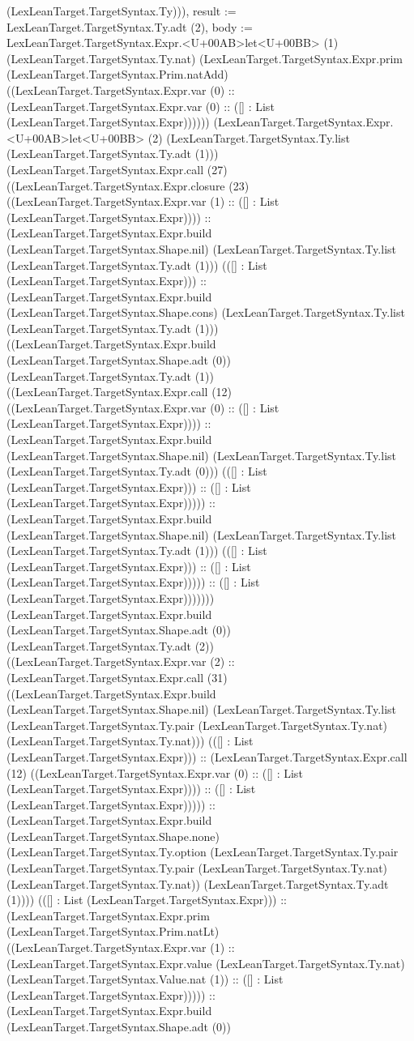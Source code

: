 \documentclass[11pt]{article}
\begin{document}
(LexLeanTarget.TargetSyntax.Ty))), result := LexLeanTarget.TargetSyntax.Ty.adt (2), body := LexLeanTarget.TargetSyntax.Expr.<U+00AB>let<U+00BB> (1) (LexLeanTarget.TargetSyntax.Ty.nat) (LexLeanTarget.TargetSyntax.Expr.prim (LexLeanTarget.TargetSyntax.Prim.natAdd) ((LexLeanTarget.TargetSyntax.Expr.var (0) :: (LexLeanTarget.TargetSyntax.Expr.var (0) :: ([] : List (LexLeanTarget.TargetSyntax.Expr)))))) (LexLeanTarget.TargetSyntax.Expr.<U+00AB>let<U+00BB> (2) (LexLeanTarget.TargetSyntax.Ty.list (LexLeanTarget.TargetSyntax.Ty.adt (1))) (LexLeanTarget.TargetSyntax.Expr.call (27) ((LexLeanTarget.TargetSyntax.Expr.closure (23) ((LexLeanTarget.TargetSyntax.Expr.var (1) :: ([] : List (LexLeanTarget.TargetSyntax.Expr)))) :: (LexLeanTarget.TargetSyntax.Expr.build (LexLeanTarget.TargetSyntax.Shape.nil) (LexLeanTarget.TargetSyntax.Ty.list (LexLeanTarget.TargetSyntax.Ty.adt (1))) (([] : List (LexLeanTarget.TargetSyntax.Expr))) :: (LexLeanTarget.TargetSyntax.Expr.build (LexLeanTarget.TargetSyntax.Shape.cons) (LexLeanTarget.TargetSyntax.Ty.list (LexLeanTarget.TargetSyntax.Ty.adt (1))) ((LexLeanTarget.TargetSyntax.Expr.build (LexLeanTarget.TargetSyntax.Shape.adt (0)) (LexLeanTarget.TargetSyntax.Ty.adt (1)) ((LexLeanTarget.TargetSyntax.Expr.call (12) ((LexLeanTarget.TargetSyntax.Expr.var (0) :: ([] : List (LexLeanTarget.TargetSyntax.Expr)))) :: (LexLeanTarget.TargetSyntax.Expr.build (LexLeanTarget.TargetSyntax.Shape.nil) (LexLeanTarget.TargetSyntax.Ty.list (LexLeanTarget.TargetSyntax.Ty.adt (0))) (([] : List (LexLeanTarget.TargetSyntax.Expr))) :: ([] : List (LexLeanTarget.TargetSyntax.Expr))))) :: (LexLeanTarget.TargetSyntax.Expr.build (LexLeanTarget.TargetSyntax.Shape.nil) (LexLeanTarget.TargetSyntax.Ty.list (LexLeanTarget.TargetSyntax.Ty.adt (1))) (([] : List (LexLeanTarget.TargetSyntax.Expr))) :: ([] : List (LexLeanTarget.TargetSyntax.Expr))))) :: ([] : List (LexLeanTarget.TargetSyntax.Expr))))))) (LexLeanTarget.TargetSyntax.Expr.build (LexLeanTarget.TargetSyntax.Shape.adt (0)) (LexLeanTarget.TargetSyntax.Ty.adt (2)) ((LexLeanTarget.TargetSyntax.Expr.var (2) :: (LexLeanTarget.TargetSyntax.Expr.call (31) ((LexLeanTarget.TargetSyntax.Expr.build (LexLeanTarget.TargetSyntax.Shape.nil) (LexLeanTarget.TargetSyntax.Ty.list (LexLeanTarget.TargetSyntax.Ty.pair (LexLeanTarget.TargetSyntax.Ty.nat) (LexLeanTarget.TargetSyntax.Ty.nat))) (([] : List (LexLeanTarget.TargetSyntax.Expr))) :: (LexLeanTarget.TargetSyntax.Expr.call (12) ((LexLeanTarget.TargetSyntax.Expr.var (0) :: ([] : List (LexLeanTarget.TargetSyntax.Expr)))) :: ([] : List (LexLeanTarget.TargetSyntax.Expr))))) :: (LexLeanTarget.TargetSyntax.Expr.build (LexLeanTarget.TargetSyntax.Shape.none) (LexLeanTarget.TargetSyntax.Ty.option (LexLeanTarget.TargetSyntax.Ty.pair (LexLeanTarget.TargetSyntax.Ty.pair (LexLeanTarget.TargetSyntax.Ty.nat) (LexLeanTarget.TargetSyntax.Ty.nat)) (LexLeanTarget.TargetSyntax.Ty.adt (1)))) (([] : List (LexLeanTarget.TargetSyntax.Expr))) :: (LexLeanTarget.TargetSyntax.Expr.prim (LexLeanTarget.TargetSyntax.Prim.natLt) ((LexLeanTarget.TargetSyntax.Expr.var (1) :: (LexLeanTarget.TargetSyntax.Expr.value (LexLeanTarget.TargetSyntax.Ty.nat) (LexLeanTarget.TargetSyntax.Value.nat (1)) :: ([] : List (LexLeanTarget.TargetSyntax.Expr))))) :: (LexLeanTarget.TargetSyntax.Expr.build (LexLeanTarget.TargetSyntax.Shape.adt (0)) 
\end{document}
